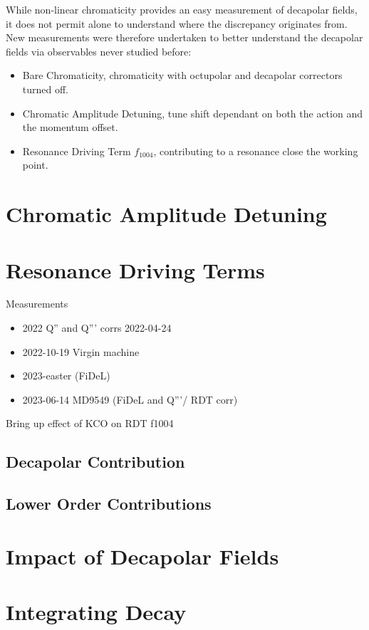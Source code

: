 While non-linear chromaticity provides an easy measurement of decapolar fields, it does not permit
alone to understand where the discrepancy originates from. 
New measurements were therefore undertaken to better understand the decapolar fields via observables
never studied before:
\begin{itemize}
    \tightlist
    \item Bare Chromaticity, chromaticity with octupolar and decapolar correctors turned off.
    \item Chromatic Amplitude Detuning, tune shift dependant on both the action and the momentum 
    offset.
    \item Resonance Driving Term $f_{1004}$, contributing to a resonance close the working point.
\end{itemize}






\section{Chromatic Amplitude Detuning}

\section{Resonance Driving Terms}

Measurements 

\begin{itemize}
    \item 2022 Q'' and Q''' corrs 2022-04-24
    \item 2022-10-19 Virgin machine
    \item 2023-easter (FiDeL)
    \item 2023-06-14 MD9549 (FiDeL and Q'''/ RDT corr)
\end{itemize}

Bring up effect of KCO on RDT f1004

\subsection{Decapolar Contribution}

\subsection{Lower Order Contributions}

\section{Impact of Decapolar Fields}

\section{Integrating Decay}